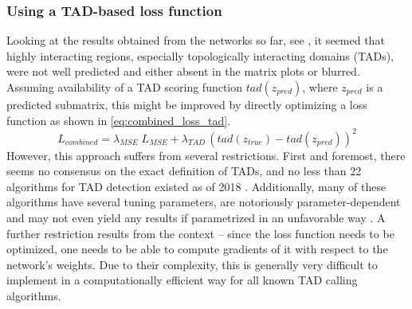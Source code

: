 \subsubsection{Using a TAD-based loss function} \label{sec:improve:TAD_loss}
Looking at the results obtained from the networks so far, see \xxx, it seemed that highly interacting regions,
especially topologically interacting domains (TADs), were not well predicted and either absent
in the matrix plots or blurred.
Assuming availability of a TAD scoring function $\mathit{tad}(z_\mathit{pred})$, where $z_\mathit{pred}$ is a predicted submatrix,
this might be improved by directly optimizing a loss function as shown in \cref{eq:combined_loss_tad}.
\begin{equation}
 L_\mathit{combined} = \lambda_\mathit{MSE}\;L_\mathit{MSE} + \lambda_\mathit{TAD} \, (\mathit{tad}(z_\mathit{true}) - \mathit{tad}(z_\mathit{pred}))^2 \label{eq:combined_loss_tad}
\end{equation}
However, this approach suffers from several restrictions.
First and foremost, there seems no consensus on the exact definition of TADs, 
and no less than 22 algorithms for TAD detection existed as of 2018 \cite{Dali2017,Zufferey2018}.
Additionally, many of these algorithms have several tuning parameters, are notoriously parameter-dependent
and may not even yield any results if parametrized in an unfavorable way \cite{Zufferey2018}. 
A further restriction results from the context -- since the loss function needs to be optimized,
one needs to be able to compute gradients of it with respect to the network's weights.
Due to their complexity, this is generally very difficult to implement in a computationally efficient way for all known TAD calling algorithms.

